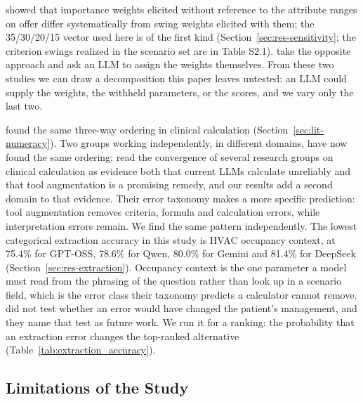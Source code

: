 \documentclass[final,3p,times]{elsarticle}
\begin{document}
\citet{vonnitzsch1993} showed that importance weights elicited without reference to the attribute ranges on offer differ systematically from swing weights elicited with them; the 35/30/20/15 vector used here is of the first kind (Section~\ref{sec:res-sensitivity}; the criterion swings realized in the scenario set are in Table S2.1). \citet{vahidnia2025walmas} take the opposite approach and ask an LLM to assign the weights themselves. From these two studies we can draw a decomposition this paper leaves untested: an LLM could supply the weights, the withheld parameters, or the scores, and we vary only the last two.

\citet{goodell2025} found the same three-way ordering in clinical calculation (Section~\ref{sec:lit-numeracy}). Two groups working independently, in different domains, have now found the same ordering; \citet{goodell2025} read the convergence of several research groups on clinical calculation as evidence both that current LLMs calculate unreliably and that tool augmentation is a promising remedy, and our results add a second domain to that evidence. Their error taxonomy makes a more specific prediction: tool augmentation removes criteria, formula and calculation errors, while interpretation errors remain. We find the same pattern independently. The lowest categorical extraction accuracy in this study is HVAC occupancy context, at 75.4\% for GPT-OSS, 78.6\% for Qwen, 80.0\% for Gemini and 81.4\% for DeepSeek (Section~\ref{sec:res-extraction}). Occupancy context is the one parameter a model must read from the phrasing of the question rather than look up in a scenario field, which is the error class their taxonomy predicts a calculator cannot remove. \citet{goodell2025} did not test whether an error would have changed the patient's management, and they name that test as future work. We run it for a ranking: the probability that an extraction error changes the top-ranked alternative (Table~\ref{tab:extraction_accuracy}).
\FloatBarrier
\subsection{Limitations of the Study}
\label{sec:limitations}
\end{document}
